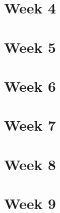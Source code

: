 \section{Week 4}



\section{Week 5}



\section{Week 6}



\section{Week 7}



\section{Week 8}




\section{Week 9}


